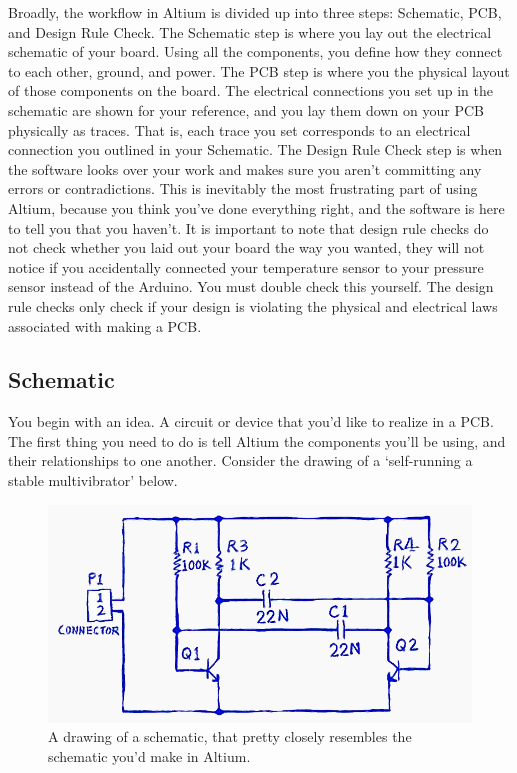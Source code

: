 \documentclass[12pt]{article}
\begin{document}
\noindent 
    Broadly, the workflow in Altium is divided up into three steps: Schematic, PCB, and Design Rule Check. The Schematic step is where you lay out the electrical schematic of your board. Using all the components, you define how they connect to each other, ground, and power. The PCB step is where you the physical layout of those components on the board. The electrical connections you set up in the schematic are shown for your reference, and you lay them down on your PCB physically as traces. That is, each trace you set corresponds to an electrical connection you outlined in your Schematic. The Design Rule Check step is when the software looks over your work and makes sure you aren't committing any errors or contradictions. This is inevitably the most frustrating part of using Altium, because you think you've done everything right, and the software is here to tell you that you haven't. It is important to note that design rule checks do not check whether you laid out your board the way you wanted, they will not notice if you accidentally connected your temperature sensor to your pressure sensor instead of the Arduino. You must double check this yourself. The design rule checks only check if your design is violating the physical and electrical laws associated with making a PCB.
    
    \subsection*{Schematic}
    You begin with an idea. A circuit or device that you'd like to realize in a PCB. The first thing you need to do is tell Altium the components you'll be using, and their relationships to one another. Consider the drawing of a `self-running a stable multivibrator' below.
    
    \begin{figure}[h]
    \begin{center}
    \includegraphics[scale=0.5]{Figures/Altium_astable.PNG}
    \caption{A drawing of a schematic, that pretty closely resembles the schematic you'd make in Altium.}
    \end{center}
    \end{figure}
    
\end{document}
